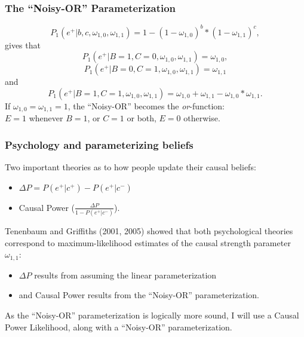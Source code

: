 \documentclass{beamer}
\begin{document}
\begin{frame}
\frametitle{The ``Noisy-OR'' Parameterization}
$$P_1(e^+ | b, c, \omega_{1, 0}, \omega_{1, 1})=1-(1-\omega_{1, 0})^b *(1-\omega_{1, 1})^c,$$
gives that
$$P_1(e^+ | B=1, C=0, \omega_{1, 0}, \omega_{1, 1})=\omega_{1, 0},$$
$$P_1(e^+ | B=0, C=1, \omega_{1, 0}, \omega_{1, 1})=\omega_{1, 1}$$
and
$$P_1(e^+ | B=1, C=1, \omega_{1, 0}, \omega_{1, 1})=\omega_{1, 0} + \omega_{1, 1} -\omega_{1, 0}*\omega_{1, 1}.$$
If $\omega_{1, 0}=\omega_{1, 1}=1$, the ``Noisy-OR'' becomes the \textit{or}-function:\\
$E=1$ whenever $B=1$, or $C=1$ or both, $E=0$ otherwise.
\end{frame}

\begin{frame}
\frametitle{Psychology and parameterizing beliefs}
Two important theories as to how people update their causal beliefs:
\begin{itemize}
\item $\Delta P = P(e^+ | c^+)-P(e^+ | c^-)$
\item Causal Power ($\frac{\Delta P}{1-P(e^+ | c^-)}$).
\end{itemize}
Tenenbaum and Griffiths (2001, 2005) showed that both psychological theories correspond to maximum-likelihood estimates of the causal strength parameter $\omega_{1, 1}$:
\begin{itemize}
\item $\Delta P$ results from assuming the linear parameterization
\item and Causal Power results from the ``Noisy-OR'' parameterization.
\end{itemize}
As the ``Noisy-OR'' parameterization is logically more sound, I will use a Causal Power Likelihood, along with a ``Noisy-OR'' parameterization.
\end{frame}
\end{document}
